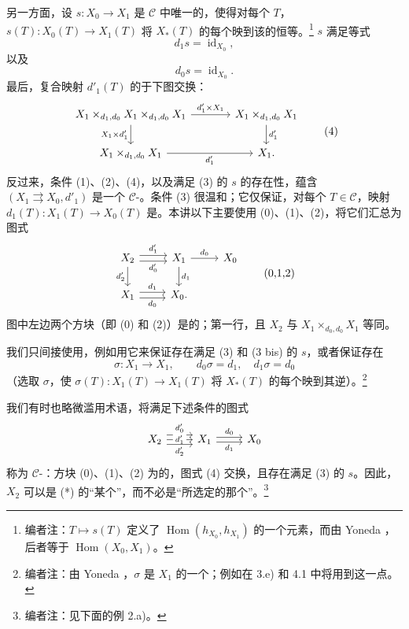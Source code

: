 另一方面，设 $s:X_0\to X_1$ 是 $\mathcal C$ 中唯一的，使得对每个 $T$，$s(T):X_0(T)\to X_1(T)$ 将 $X_*(T)$ 的每个映到该的恒等。\footnote{编者注：$T\mapsto s(T)$ 定义了 $\operatorname{Hom}(h_{X_0},h_{X_1})$ 的一个元素，而由 Yoneda ，后者等于 $\operatorname{Hom}(X_0,X_1)$。} $s$ 满足等式
\[d_1s=\operatorname{id}_{X_0},\tag{3}\]
以及
\[d_0s=\operatorname{id}_{X_0}.\tag{3 bis}\]
最后，复合映射 $d'_1(T)$ 的于下图交换：
\[
\begin{tikzcd}[column sep=large]
X_1\times_{d_1,d_0}X_1\times_{d_1,d_0}X_1\arrow[r,"d'_1\times X_1"]\arrow[d,"X_1\times d'_1"']&X_1\times_{d_1,d_0}X_1\arrow[d,"d'_1"]\\
X_1\times_{d_1,d_0}X_1\arrow[r,"d'_1"']&X_1.
\end{tikzcd}\tag{4}
\]
反过来，条件 (1)、(2)、(4)，以及满足 (3) 的 $s$ 的存在性，蕴含 $(X_1\rightrightarrows X_0,d'_1)$ 是一个 $\mathcal C$-。条件 (3) 很温和；它仅保证，对每个 $T\in\mathcal C$，映射 $d_1(T):X_1(T)\to X_0(T)$ 是。本讲以下主要使用 (0)、(1)、(2)，将它们汇总为图式
\[
\begin{tikzcd}
X_2\arrow[r,shift left=.6ex,"d'_1"]\arrow[r,shift right=.6ex,"d'_0"']\arrow[d,"d'_2"']&X_1\arrow[r,"d_0"]\arrow[d,"d_1"]&X_0\\
X_1\arrow[r,shift left=.6ex,"d_1"]\arrow[r,shift right=.6ex,"d_0"']&X_0.&
\end{tikzcd}\tag{0,1,2}
\]
图中左边两个方块（即 (0) 和 (2)）是的；第一行，且 $X_2$ 与 $X_1\times_{d_0,d_0}X_1$ 等同。

我们只间接使用，例如用它来保证存在满足 (3) 和 (3 bis) 的 $s$，或者保证存在
\[\sigma:X_1\to X_1,\qquad d_0\sigma=d_1,\quad d_1\sigma=d_0\tag{$\dagger$}\]
（选取 $\sigma$，使 $\sigma(T):X_1(T)\to X_1(T)$ 将 $X_*(T)$ 的每个映到其逆）。\footnote{编者注：由 Yoneda ，$\sigma$ 是 $X_1$ 的一个；例如在 3.e) 和 4.1 中将用到这一点。}

我们有时也略微滥用术语，将满足下述条件的图式
\[
\begin{tikzcd}
X_2\arrow[r,shift left=1ex,"d'_0"]\arrow[r,"d'_1" description]\arrow[r,shift right=1ex,"d'_2"']&X_1\arrow[r,shift left=.5ex,"d_0"]\arrow[r,shift right=.5ex,"d_1"']&X_0
\end{tikzcd}
\]
称为 $\mathcal C$-：方块 (0)、(1)、(2) 为的，图式 (4) 交换，且存在满足 (3) 的 $s$。因此， $X_2$ 可以是 (*) 的“某个”，而不必是“所选定的那个”。\footnote{编者注：见下面的例 2.a)。}

